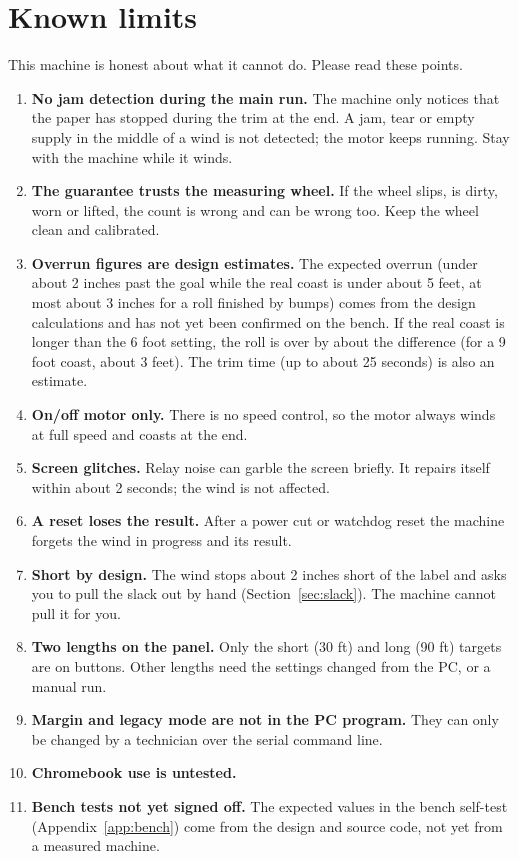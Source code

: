 \chapter{Known limits}\label{ch:limits}

This machine is honest about what it cannot do. Please read these points.

\begin{enumerate}[itemsep=0.6em]
  \item \textbf{No jam detection during the main run.} The machine only
        notices that the paper has stopped during the trim at the end. A jam,
        tear or empty supply in the middle of a wind is not detected; the
        motor keeps running. Stay with the machine while it winds.
  \item \textbf{The guarantee trusts the measuring wheel.} If the wheel slips,
        is dirty, worn or lifted, the count is wrong and  can be
        wrong too. Keep the wheel clean and calibrated.
  \item \textbf{Overrun figures are design estimates.} The expected overrun
        (under about 2 inches past the goal while the real coast is under
        about 5 feet, at most about 3 inches for a roll finished by bumps)
        comes from the design calculations and has not yet been confirmed on
        the bench. If the real coast is longer than the 6 foot setting, the
        roll is over by about the difference (for a 9 foot coast, about 3
        feet). The trim time (up to about 25 seconds) is also an estimate.
  \item \textbf{On/off motor only.} There is no speed control, so the motor
        always winds at full speed and coasts at the end.
  \item \textbf{Screen glitches.} Relay noise can garble the screen briefly. It
        repairs itself within about 2 seconds; the wind is not affected.
  \item \textbf{A reset loses the result.} After a power cut or watchdog reset
        the machine forgets the wind in progress and its result.
  \item \textbf{Short by design.} The wind stops about 2 inches short of the
        label and asks you to pull the slack out by hand
        (Section~\ref{sec:slack}). The machine cannot pull it for you.
  \item \textbf{Two lengths on the panel.} Only the short (30 ft) and long
        (90 ft) targets are on buttons. Other lengths need the settings changed
        from the PC, or a manual run.
  \item \textbf{Margin and legacy mode are not in the PC program.} They can only
        be changed by a technician over the serial command line.
  \item \textbf{Chromebook use is untested.}
  \item \textbf{Bench tests not yet signed off.} The expected values in the bench
        self-test (Appendix~\ref{app:bench}) come from the design and source
        code, not yet from a measured machine.
\end{enumerate}
